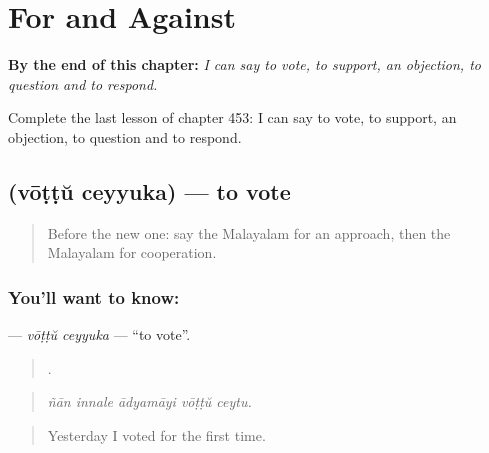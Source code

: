 
\chapter{For and Against}
\label{ch:ml-for-and-against}

\begin{chapteropening}
\textbf{By the end of this chapter:} \emph{I can say to vote, to support, an objection, to question and to respond.}

Complete the last lesson of chapter 453: I can say to vote, to support, an objection, to question and to respond.
\end{chapteropening}

\section[\texorpdfstring{\ml{വോട്ട്} \ml{ചെയ്യുക} (vōṭṭŭ ceyyuka)}{വോട്ട് ചെയ്യുക (vōṭṭŭ ceyyuka)}]{  (vōṭṭŭ ceyyuka) — to vote}

\label{lesson:ML-C453-vottu-ceyyuka}



\begin{quote}
Before the new one: say the Malayalam for an approach, then the Malayalam for cooperation.
\end{quote}

\subsection*{You'll want to know:  }
\textbf{ } — \emph{vōṭṭŭ ceyyuka} — \textquotedblleft{}to vote\textquotedblright{}.

\begin{quote}
    .
\end{quote}

\begin{quote}
\emph{ñān innale ādyamāyi vōṭṭŭ ceytu.}
\end{quote}

\begin{quote}
Yesterday I voted for the first time.
\end{quote}


